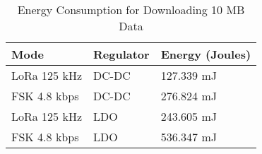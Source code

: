\begin{table*}[ht!]
    \centering
    \footnotesize
    \begin{tabularx}{0.8\columnwidth}{l l l}
    \toprule
    Mode & Regulator & Energy (Joules) \\
    \midrule
    LoRa 125 kHz & DC-DC & 127.339 mJ \\
    FSK 4.8 kbps & DC-DC & 276.824 mJ \\
    LoRa 125 kHz & LDO & 243.605 mJ \\
    FSK 4.8 kbps & LDO & 536.347 mJ \\
    \bottomrule
    \end{tabularx}
    \caption{Energy Consumption for Downloading 10 MB Data}
    \label{tab:lora_rx}
\end{table*}